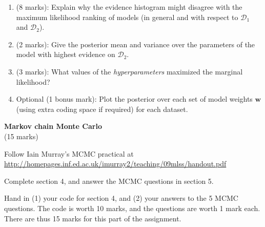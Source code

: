 \documentclass[11pt]{article}
\newcommand{\mbf}[1]{{\boldsymbol{\mathbf{#1}}}}
\renewcommand{\bm}{\mbf}
\begin{document}
\begin{enumerate}
\begin{enumerate}
\item (8 marks): Explain why the evidence histogram might disagree with the maximum likelihood ranking of models (in general and with respect to $\mathcal{D}_1$ and $\mathcal{D}_2$).
\item (2 marks): Give the posterior mean and variance over the parameters of the model with highest evidence on $\mathcal{D}_2$.
\item (3 marks): What values of the \emph{hyperparameters} maximized the marginal likelihood? 
\item Optional (1 bonus mark): Plot the posterior over each set of model weights $\bm{w}$  (using extra coding space if required) for each dataset.

\end{enumerate}

\end{enumerate}

\vspace{10mm}
\textbf{Markov chain Monte Carlo} \\
(15 marks)

Follow Iain Murray's MCMC practical at \\
\url{http://homepages.inf.ed.ac.uk/imurray2/teaching/09mlss/handout.pdf}

Complete section 4, and answer the MCMC questions in section 5.

Hand in (1) your code for section 4, and (2) your answers to the 5 MCMC questions.  The code is worth 10 marks, and the questions are worth 1 mark each.  There are thus 15 marks for this part of the assignment.
\end{document}
